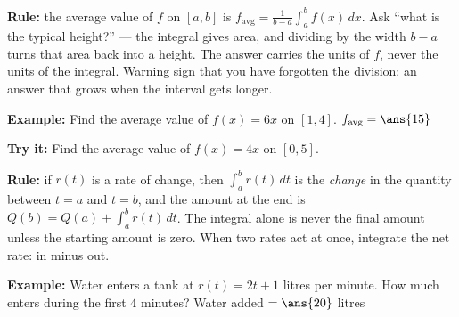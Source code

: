 \documentclass[12pt]{article}
\begin{document}


\begin{formulabox}
\textbf{Rule:} the average value of $f$ on $[a, b]$ is
$f_{\text{avg}} = \frac{1}{b-a}\int_a^b f(x)\,dx$. Ask ``what is the typical
height?'' --- the integral gives area, and dividing by the width $b - a$ turns
that area back into a height. The answer carries the units of $f$, never the
units of the integral. Warning sign that you have forgotten the division: an
answer that grows when the interval gets longer.
\end{formulabox}

\begin{examplebox}
\textbf{Example:} Find the average value of $f(x) = 6x$ on $[1, 4]$.
$f_{\text{avg}} = \ans{15}$
\end{examplebox}

\begin{tryitbox}
\textbf{Try it:} Find the average value of $f(x) = 4x$ on $[0, 5]$.\\[2pt]
\end{tryitbox}


\begin{formulabox}
\textbf{Rule:} if $r(t)$ is a rate of change, then $\int_a^b r(t)\,dt$ is the
\emph{change} in the quantity between $t = a$ and $t = b$, and the amount at the
end is $Q(b) = Q(a) + \int_a^b r(t)\,dt$. The integral alone is never the final
amount unless the starting amount is zero. When two rates act at once, integrate
the net rate: in minus out.
\end{formulabox}

\begin{examplebox}
\textbf{Example:} Water enters a tank at $r(t) = 2t + 1$ litres per minute. How
much enters during the first $4$ minutes?
Water added $= \ans{20}$ litres
\end{examplebox}
\end{document}

